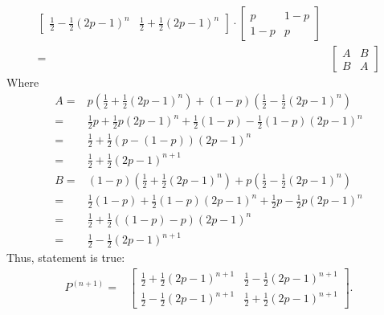 \documentclass[12pt]{article}
\begin{document}
\begin{solution}
\begin{align}
\begin{bmatrix}
\frac{1}{2} - \frac{1}{2}(2p - 1)^{n} & \frac{1}{2} + \frac{1}{2}(2p - 1)^{n}
\end{bmatrix} \cdot \begin{bmatrix}
p & 1 - p \\
1 - p & p 
\end{bmatrix} \\
= & \begin{bmatrix}
A & B \\
B & A 
\end{bmatrix}
\end{align}
Where
\begin{align}
    A = & p(\frac{1}{2} + \frac{1}{2}(2p - 1)^{n}) + (1-p)(\frac{1}{2} - \frac{1}{2}(2p - 1)^{n})\\
      = & \frac{1}{2}p + \frac{1}{2}p(2p - 1)^{n} + \frac{1}{2}(1-p) - \frac{1}{2}(1-p)(2p - 1)^{n} \\
      = & \frac{1}{2} + \frac{1}{2}(p - (1-p))(2p - 1)^{n}\\
      = & \frac{1}{2} + \frac{1}{2}(2p - 1)^{n+1} \\
    B = & (1-p)(\frac{1}{2} + \frac{1}{2}(2p - 1)^{n}) + p(\frac{1}{2} - \frac{1}{2}(2p - 1)^{n})\\
      = & \frac{1}{2}(1-p) + \frac{1}{2}(1-p)(2p - 1)^{n} + \frac{1}{2}p - \frac{1}{2}p(2p - 1)^{n} \\
      = & \frac{1}{2} + \frac{1}{2}((1-p)-p)(2p - 1)^{n}\\
      = & \frac{1}{2} - \frac{1}{2}(2p - 1)^{n+1} 
\end{align}
Thus, statement is true:
\begin{align}
P^{(n+1)} = & \begin{bmatrix}
\frac{1}{2} + \frac{1}{2}(2p - 1)^{n+1} & \frac{1}{2} - \frac{1}{2}(2p - 1)^{n+1} \\
\frac{1}{2} - \frac{1}{2}(2p - 1)^{n+1} & \frac{1}{2} + \frac{1}{2}(2p - 1)^{n+1}
\end{bmatrix}.
\end{align}

\end{solution}
\end{document}
